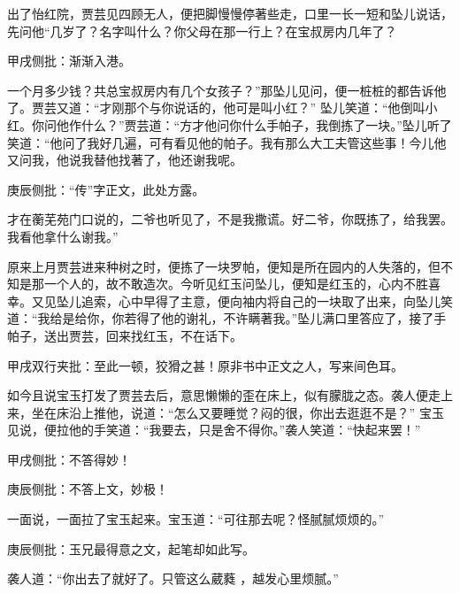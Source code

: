 \begin{parag}


    出了怡红院，贾芸见四顾无人，便把脚慢慢停著些走，口里一长一短和坠儿说话，先问他“几岁了？名字叫什么？你父母在那一行上？在宝叔房内几年了？\begin{note}甲戌侧批：渐渐入港。\end{note}一个月多少钱？共总宝叔房内有几个女孩子？”那坠儿见问，便一桩桩的都告诉他了。贾芸又道：“才刚那个与你说话的，他可是叫小红？” 坠儿笑道：“他倒叫小红。你问他作什么？”贾芸道：“方才他问你什么手帕子，我倒拣了一块。”坠儿听了笑道：“他问了我好几遍，可有看见他的帕子。我有那么大工夫管这些事！今儿他又问我，他说我替他找著了，他还谢我呢。\begin{note}庚辰侧批：“传”字正文，此处方露。\end{note}才在蘅芜苑门口说的，二爷也听见了，不是我撒谎。好二爷，你既拣了，给我罢。我看他拿什么谢我。”
\end{parag}


\begin{parag}


    原来上月贾芸进来种树之时，便拣了一块罗帕，便知是所在园内的人失落的，但不知是那一个人的，故不敢造次。今听见红玉问坠儿，便知是红玉的，心内不胜喜幸。又见坠儿追索，心中早得了主意，便向袖内将自己的一块取了出来，向坠儿笑道：“我给是给你，你若得了他的谢礼，不许瞒著我。”坠儿满口里答应了，接了手帕子，送出贾芸，回来找红玉，不在话下。\begin{note}甲戌双行夹批：至此一顿，狡猾之甚！原非书中正文之人，写来间色耳。\end{note}
\end{parag}


\begin{parag}


    如今且说宝玉打发了贾芸去后，意思懒懒的歪在床上，似有朦胧之态。袭人便走上来，坐在床沿上推他，说道：“怎么又要睡觉？闷的很，你出去逛逛不是？” 宝玉见说，便拉他的手笑道：“我要去，只是舍不得你。”袭人笑道：“快起来罢！”\begin{note}甲戌侧批：不答得妙！\end{note}\begin{note}庚辰侧批：不答上文，妙极！\end{note}一面说，一面拉了宝玉起来。宝玉道：“可往那去呢？怪腻腻烦烦的。”\begin{note}庚辰侧批：玉兄最得意之文，起笔却如此写。\end{note}袭人道：“你出去了就好了。只管这么葳蕤 ，越发心里烦腻。”
\end{parag}


